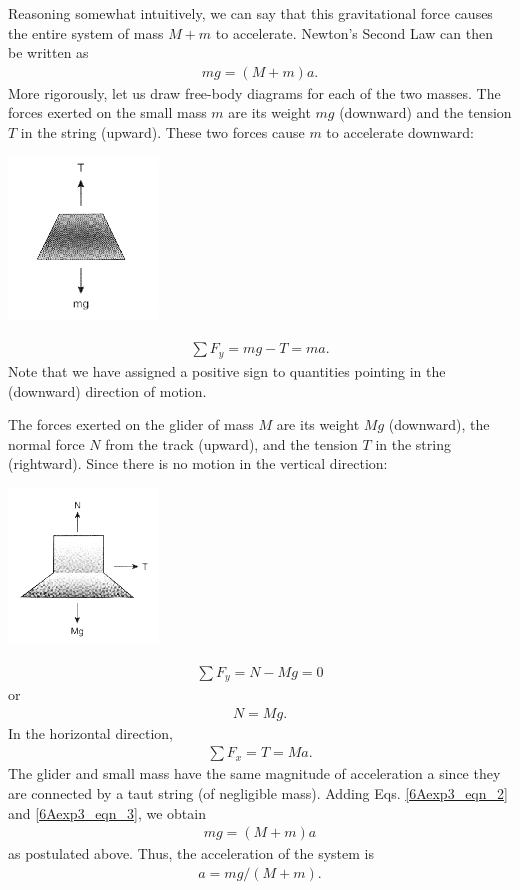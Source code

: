 Reasoning somewhat intuitively, we can say that this gravitational force causes the entire system of mass \(M + m\) to accelerate.  Newton's Second Law can then be written as
\begin{align} mg = (M + m)a. \label{6Aexp3_eqn_1} \end{align}
More rigorously, let us draw free-body diagrams for each of the two masses.  The forces exerted on the small mass \(m\) are its weight \(mg\) (downward) and the tension \(T\) in the string (upward).  These two forces cause \(m\) to accelerate downward:
\begin{center} \includegraphics*[width=0.3\textwidth]{imgs/6labs/6Alab/6Aexp3/IMG_043_sm.png} \end{center}
\begin{align} \sum F_y = mg - T = ma. \label{6Aexp3_eqn_2} \end{align}
Note that we have assigned a positive sign to quantities pointing in the (downward) direction of motion.

The forces exerted on the glider of mass \(M\) are its weight \(Mg\) (downward), the normal force \(N\) from the track (upward), and the tension \(T\) in the string (rightward).  Since there is no motion in the vertical direction:
\begin{center} \includegraphics*[width=0.3\textwidth]{imgs/6labs/6Alab/6Aexp3/IMG_044_sm.png} \end{center}
\begin{align} \sum F_y = N - Mg = 0 \end{align}
or
\begin{align} N = Mg. \end{align}
In the horizontal direction,
\begin{align} \sum F_x = T = Ma. \label{6Aexp3_eqn_3} \end{align}
The glider and small mass have the same magnitude of acceleration a since they are connected by a taut string (of negligible mass).  Adding Eqs. \ref{6Aexp3_eqn_2} and \ref{6Aexp3_eqn_3}, we obtain
\begin{align} mg = (M + m)a \end{align}
as postulated above.  Thus, the acceleration of the system is
\begin{align} a = mg/(M+m). \label{6Aexp3_eqn_4} \end{align}

